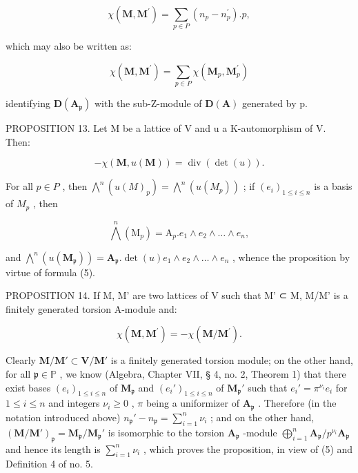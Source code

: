 \[
\chi (\mathbf {M}, \mathbf {M} ^ {\prime}) = \sum_ {p \in P} (n _ {p} - n _ {p} ^ {\prime}). p,
\]

which may also be written as:

\[
\chi (\mathbf {M}, \mathbf {M} ^ {\prime}) = \sum_ {p \in P} \chi (\mathbf {M} _ {p}, \mathbf {M} _ {p} ^ {\prime})\tag{5}
\]

identifying \(\mathbf{D}(\mathbf{A}_{\mathfrak{p}})\) with the sub-Z-module of \(\mathbf{D}(\mathbf{A})\) generated by p.

PROPOSITION 13. Let M be a lattice of V and u a K-automorphism of V. Then:

\[
- \chi (\mathbf {M}, u (\mathbf {M})) = \operatorname{div} (\det (u)).\tag{6}
\]

For all \(p \in P\) , then \(\bigwedge^{n} (u(M)_{p}) = \bigwedge^{n} (u(M_{p}))\) ; if \((e_{i})_{1 \leqslant i \leqslant n}\) is a basis of \(M_{p}\) , then

\[
\bigwedge^ {n} \left(\mathrm{M} _ {p}\right) = \mathrm{A} _ {p}. e _ {1} \wedge e _ {2} \wedge \dots \wedge e _ {n},
\]

and \(\bigwedge^{n}(u(\mathbf{M}_{\mathfrak{p}})) = \mathbf{A}_{\mathfrak{p}}.\det (u)e_{1}\wedge e_{2}\wedge \dots \wedge e_{n}\) , whence the proposition by virtue of formula (5).

PROPOSITION 14. If M, M' are two lattices of V such that M' ⊂ M, M/M' is a finitely generated torsion A-module and:

\[
\chi (\mathbf {M}, \mathbf {M} ^ {\prime}) = - \chi (\mathbf {M} / \mathbf {M} ^ {\prime}).\tag{7}
\]

Clearly \(\mathbf{M} / \mathbf{M}' \subset \mathbf{V} / \mathbf{M}'\) is a finitely generated torsion module; on the other hand, for all \(\mathfrak{p} \in \mathbb{P}\) , we know (Algebra, Chapter VII, § 4, no. 2, Theorem 1) that there exist bases \((e_i)_{1 \leqslant i \leqslant n}\) of \(\mathbf{M}_{\mathfrak{p}}\) and \((e_i')_{1 \leqslant i \leqslant n}\) of \(\mathbf{M}_{\mathfrak{p}}'\) such that \(e_i' = \pi^{\nu_i} e_i\) for \(1 \leqslant i \leqslant n\) and integers \(\nu_i \geqslant 0\) , \(\pi\) being a uniformizer of \(\mathbf{A}_{\mathfrak{p}}\) . Therefore (in the notation introduced above) \(n_{\mathfrak{p}}' - n_{\mathfrak{p}} = \sum_{i=1}^{n} \nu_i\) ; and on the other hand, \((\mathbf{M} / \mathbf{M}')_{\mathfrak{p}} = \mathbf{M}_{\mathfrak{p}} / \mathbf{M}_{\mathfrak{p}}'\) is isomorphic to the torsion \(\mathbf{A}_{\mathfrak{p}}\) -module \(\bigoplus_{i=1}^{n} \mathbf{A}_{\mathfrak{p}} / p^{\nu_i} \mathbf{A}_{\mathfrak{p}}\) and hence its length is \(\sum_{i=1}^{n} \nu_i\) , which proves the proposition, in view of (5) and Definition 4 of no. 5.

